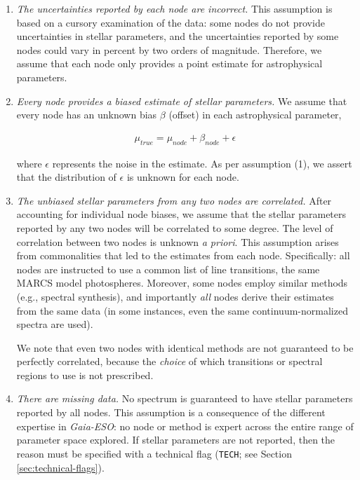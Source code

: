 \documentclass[preprint]{aastex}
\newcommand{\project}[1]{\textsl{#1}}
\newcommand{\gaiaeso}{\project{Gaia-ESO}}
\begin{document}
\begin{enumerate}
    \item   \emph{The uncertainties reported by each node are incorrect.}
            This assumption is based on a cursory examination of the data:
            some nodes do not provide uncertainties in stellar parameters, and
            the uncertainties reported by some nodes could vary in percent by
            two orders of magnitude. Therefore, we assume that each node only
            provides a point estimate for astrophysical parameters.

    \item   \emph{Every node provides a biased estimate of stellar parameters.}
            We assume that every node has an unknown bias $\beta$ (offset) in each
            astrophysical parameter, 

            \begin{eqnarray}
                \mu_{true} = \mu_{node} + \beta_{node} + \epsilon
            \end{eqnarray}

            \noindent{}where $\epsilon$ represents the noise in the estimate. As per
            assumption (1), we assert that the distribution of $\epsilon$ is unknown
            for each node. 

    \item   \emph{The unbiased stellar parameters from any two nodes are correlated.}
            After accounting for individual node biases, we assume that the stellar 
            parameters reported by any two nodes will be correlated to some degree. 
            The level of correlation between two nodes is unknown \emph{a priori}.
            This assumption arises from commonalities that led to the estimates from
            each node. Specifically: all nodes are instructed to use a common list 
            of line transitions, the same MARCS model photospheres. Moreover, some 
            nodes employ similar methods (e.g., spectral synthesis), and importantly
            \emph{all} nodes derive their estimates from the same data (in some 
            instances, even the same continuum-normalized spectra are used).

            We note that even two nodes with identical methods are not guaranteed
            to be perfectly correlated, because the \emph{choice} of which transitions
            or spectral regions to use is not prescribed.

    \item   \emph{There are missing data.} 
            No spectrum is guaranteed to have stellar parameters reported by all
            nodes. This assumption is a consequence of the different expertise in
            \gaiaeso: no node or method is expert across the entire range of parameter
            space explored. If stellar parameters are not reported, then the reason 
            must be specified with a technical flag (\texttt{TECH}; see Section 
            \ref{sec:technical-flags}).


\end{enumerate}
\end{document}
